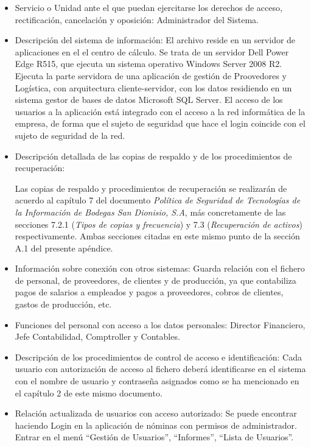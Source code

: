 \documentclass[a4paper,11pt,bibtotoc,noliststotoc]{scrbook}
\begin{document}
\begin{itemize}
\item Servicio o Unidad ante el que puedan ejercitarse los derechos de acceso, rectificación, cancelación y oposición: Administrador del Sistema.

\item Descripción del sistema de información: El archivo reside en un servidor de aplicaciones en el el centro de cálculo. Se trata de un servidor Dell Power Edge R515, que ejecuta un sistema operativo Windows Server 2008 R2. Ejecuta la parte servidora de una aplicación de gestión de Proovedores y Logística, con arquitectura cliente-servidor, con los datos residiendo en un sistema gestor de bases de datos Microsoft SQL Server. El acceso de los usuarios a la aplicación está integrado con el acceso a la red informática de la empresa, de forma que el sujeto de seguridad que hace el login coincide con el sujeto de seguridad de la red.

\item Descripción detallada de las copias de respaldo y de los procedimientos de recuperación:

Las copias de respaldo y procedimientos de recuperación se realizarán de acuerdo al capítulo 7 del documento \emph{Política de Seguridad de Tecnologías de la Información de Bodegas San Dionisio, S.A}, más concretamente de las secciones 7.2.1 (\emph{Tipos de copias y frecuencia}) y 7.3 (\emph{Recuperación de activos}) respectivamente. Ambas secciones citadas en este mismo punto de la sección A.1 del presente apéndice.

\item Información sobre conexión con otros sistemas: Guarda relación con el fichero de personal, de proveedores, de clientes y de producción, ya que contabiliza pagos de salarios a empleados y pagos a proveedores, cobros de clientes, gastos de producción, etc.

\item Funciones del personal con acceso a los datos personales: Director Financiero, Jefe Contabilidad, Comptroller y Contables.

\item Descripción de los procedimientos de control de acceso e identificación: Cada usuario con autorización de acceso al fichero deberá identificarse en el sistema con el nombre de usuario y contraseña asignados como se ha mencionado en el capítulo 2 de este mismo documento.

\item Relación actualizada de usuarios con acceso autorizado: Se puede encontrar haciendo Login en la aplicación de nóminas con permisos de administrador. Entrar en el menú "`Gestión de Usuarios"', "`Informes"', "`Lista de Usuarios"'.


\end{itemize}
\end{document}
